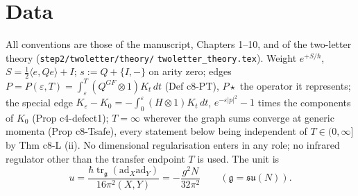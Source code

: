 \documentclass[11pt]{article}
\numberwithin{equation}{section}
\theoremstyle{plain}
\theoremstyle{definition}
\begin{document}
\tableofcontents

\section{Data}
\label{sec:cc-data}

All conventions are those of the manuscript, Chapters 1--10, and of the two-letter theory (\texttt{step2/twoletter/theory/} \texttt{twoletter\_theory.tex}). Weight $e^{+S/\hbar}$, $S=\tfrac12\langle e,Qe\rangle+I$; $s:=Q+\{I,-\}$ on arity zero; edges $P=P(\varepsilon,T)=\int_\varepsilon^T(Q^{GF}\otimes1)K_t\,dt$ (Def c8-PT), $P\star$ the operator it represents; the special edge $K_\varepsilon-K_0=-\int_0^\varepsilon(H\otimes1)K_t\,dt$, $e^{-\varepsilon|p|^2}-1$ times the components of $K_0$ (Prop c4-defect1); $T=\infty$ wherever the graph sums converge at generic momenta (Prop c8-Tsafe), every statement below being independent of $T\in(0,\infty]$ by Thm c8-L (ii). No dimensional regularisation enters in any role; no infrared regulator other than the transfer endpoint $T$ is used. The unit is
\[
u=\frac{\hbar\operatorname{tr}_{\mathfrak g}(\mathrm{ad}_X\mathrm{ad}_Y)}{16\pi^2(X,Y)}=-\frac{g^2N}{32\pi^2}\qquad(\mathfrak g=\mathfrak{su}(N)).
\]
\end{document}
